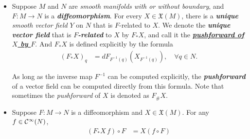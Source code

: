\documentclass[11pt]{article}
\begin{document}
\begin{itemize}
\item \begin{definition}
Suppose $M$ and $N$ are \emph{smooth manifolds with or without boundary}, and $F: M \rightarrow N$ is a \textbf{\emph{diffeomorphism}}. For every $X \in \mathfrak{X}(M)$, there is a \textbf{\emph{unique}} \emph{smooth vector field} $Y$ on $N$ that is $F$-related to $X$. We denote the \emph{\textbf{unique vector field}} that is \emph{\textbf{$F$-related}} to $X$ by \underline{$F_{*}X$}, and call it the \underline{\emph{\textbf{pushforward of $X$ by $F$}}}. And $F_{*}X$ is defined explicitly by the formula
\begin{align}
(F_{*}X)_{q} &= dF_{F^{-1}(q)}(X_{F^{-1}(q)}),\quad \forall q\in N. \label{eqn: pushforward_of_vector_fields}
\end{align} 
\end{definition}
As long as the inverse map $F^{-1}$ can be computed explicitly, the \emph{\textbf{pushforward}} of a vector field can be computed directly from this formula. Note that sometimes the \emph{pushforward} of $X$ is denoted as $F_{\#}X$.

\item \begin{corollary}
Suppose $F: M \rightarrow N$ is a diffeomorphism and $X \in \mathfrak{X}(M)$.  For any $f \in {\mathcal C}^{\infty}(N)$, 
\begin{align*}
(F_{*}X\,f) \circ F &= X(f \circ F)
\end{align*}
\end{corollary}
\end{itemize}
\end{document}
